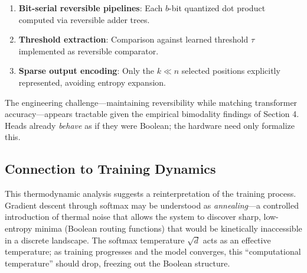 \begin{enumerate}






    \item \textbf{Bit-serial reversible pipelines}: Each $b$-bit quantized dot product computed via reversible adder trees.






    \item \textbf{Threshold extraction}: Comparison against learned threshold $\tau$ implemented as reversible comparator.






    \item \textbf{Sparse output encoding}: Only the $k \ll n$ selected positions explicitly represented, avoiding entropy expansion.






\end{enumerate}













The engineering challenge—maintaining reversibility while matching transformer accuracy—appears tractable given the empirical bimodality findings of Section 4. Heads already \emph{behave} as if they were Boolean; the hardware need only formalize this.













\subsection{Connection to Training Dynamics}













This thermodynamic analysis suggests a reinterpretation of the training process. Gradient descent through softmax may be understood as \emph{annealing}—a controlled introduction of thermal noise that allows the system to discover sharp, low-entropy minima (Boolean routing functions) that would be kinetically inaccessible in a discrete landscape. The softmax temperature $\sqrt{d}$ acts as an effective temperature; as training progresses and the model converges, this ``computational temperature'' should drop, freezing out the Boolean structure.













